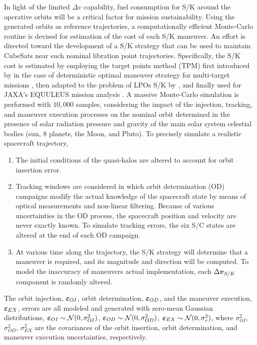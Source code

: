 In light of the limited $\Delta v$ capability, fuel consumption for S/K around the operative orbits will be a critical factor for mission sustainability. Using the generated orbits as reference trajectories, a computationally efficient Monte-Carlo routine is devised for estimation of the cost of each S/K maneuver. An effort is directed toward the development of a S/K strategy that can be used to maintain CubeSats near  such nominal libration point trajectories. Specifically, the S/K cost is estimated by employing the target points method (TPM) first introduced by \citeauthor{dwivedi1975} in the case of deterministic optimal maneuver strategy for multi-target missions \cite{dwivedi1975}, then adapted to the problem of LPOs S/K by \textcite{howell1993stationkeeping}, and finally used for JAXA's EQUULEUS mission analysis \cite{kenshiro2017equuleus}. A massive Monte-Carlo simulation is performed with $10,000$ samples, considering the impact of the injection, tracking, and maneuver execution processes on the nominal orbit determined in the presence of solar radiation pressure and gravity of the main solar system celestial bodies (\ie sun, $8$ planets, the Moon, and Pluto). To precisely simulate a realistic spacecraft trajectory,
%
\begin{enumerate}
	\item The initial conditions of the quasi-halos are altered to account for orbit insertion error.
	\item Tracking windows are considered in which orbit determination (OD) campaigns modify the actual knowledge of the spacecraft state by means of optical measurements and non-linear filtering. Because of various uncertainties in the {OD} process, the spacecraft position and velocity are never exactly known. To simulate tracking errors, the six S/C states are altered at the end of each {OD} campaign.
	\item At various time along the trajectory, the S/K strategy will determine that a maneuver is required, and its magnitude and direction will be computed. To model the inaccuracy of maneuvers actual implementation, each $\Delta\boldsymbol{v}_{S/K}$ component is randomly altered.
\end{enumerate}
%
The orbit injection, $\boldsymbol{\varepsilon}_{OI}$, orbit determination, $\boldsymbol{\varepsilon}_{OD}$, and the maneuver execution, $\boldsymbol{\varepsilon}_{EX}$, errors are all modeled and generated with zero-mean Gaussian distributions, \ie $\boldsymbol{\varepsilon}_{OI}\sim\mathcal{N}(0,\sigma_{OI}^2)$, $\boldsymbol{\varepsilon}_{OD}\sim\mathcal{N}(0,\sigma_{OD}^2)$, $\boldsymbol{\varepsilon}_{EX}\sim\mathcal{N}(0,\sigma_{v}^2)$, where $\sigma_{OI}^2$, $\sigma_{OD}^2$, $\sigma_{EX}^2$ are the covariances of the orbit insertion, orbit determination, and maneuver execution uncertainties, respectively.


